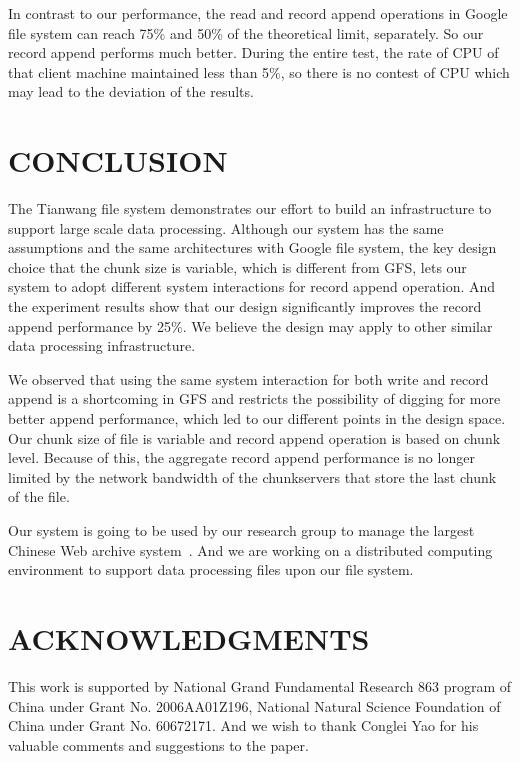 \documentclass[letterpaper,twocolumn,10pt]{article}
\begin{document}
In contrast to our performance, the read and record append operations in Google file system can reach 75\% and 50\% of the theoretical limit, separately. So our record append performs much better. During the entire test, the rate of CPU of that client machine maintained less than 5\%, so there is no contest of CPU which may lead to the deviation of the results.
\section{CONCLUSION}
The Tianwang file system demonstrates our effort to build an infrastructure to support large scale data processing. Although our system has the same assumptions and the same architectures with Google file system, the key design choice that the chunk size is variable, which is different from GFS, lets our system to adopt different system interactions for record append operation. And the experiment results show that our design significantly improves the record append performance by 25\%. We believe the design may apply to other similar data processing infrastructure.

We observed that using the same system interaction for both write and record append is a shortcoming in GFS and restricts the possibility of digging for more better append performance, which led to our different points in the design space. Our chunk size of file is variable and record append operation is based on chunk level. Because of this, the aggregate record append performance is no longer limited by the network bandwidth of the chunkservers that store the last chunk of the file. 

Our system is going to be used by our research group to manage the largest Chinese Web archive system~\cite{infomall}. And we are working on a distributed computing environment to support data processing files upon our file system.
\section{ACKNOWLEDGMENTS}
This work is supported by National Grand Fundamental Research 863 program of China under Grant No. 2006AA01Z196, National Natural Science Foundation of China under Grant No. 60672171. And we wish to thank Conglei Yao for his valuable comments and suggestions to the paper. 

{\footnotesize 
}
\end{document}
